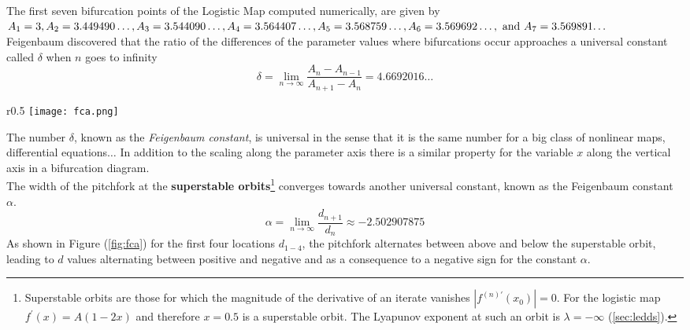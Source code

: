 The first seven bifurcation points of the Logistic Map computed numerically, are given by \\
$A_1=3, A_2=3.449490\ldots, A_3=3.544090\ldots, A_4=3.564407\ldots, A_5=3.568759\ldots,
A_6=3.569692\ldots,\text{ and}\\ \ A_7=3.569891{\ldots}$\\
Feigenbaum discovered that the ratio of the differences of the parameter values where bifurcations occur approaches a universal constant called $\delta$ when $n$ goes to infinity
\begin{equation}
	\delta=\lim_{n\rightarrow\infty}\frac{A_{n}-A_{n-1}}{A_{n+1}-A_n}=4.6692016\ldots
\end{equation}
\begin{wrapfigure}{r}{0.5\textwidth}
	\centering
	\texttt{[image: fca.png]}
	\caption{Universal scaling in the horizontal and vertical direction of a period doubling sequence.}
	\label{fig:fca}
\end{wrapfigure}
The number $\delta$, known as the \emph{Feigenbaum constant}, is universal in the sense that it is the same number for a big class of nonlinear maps, differential equations$\ldots$
In addition to the scaling along the parameter axis there is a similar property for the variable $x$ along the vertical axis in a bifurcation diagram.\\
The width of the pitchfork at the \textbf{superstable orbits}\footnote{Superstable orbits are those for which the magnitude of the derivative of an iterate vanishes $|f^{(n)\prime}(x_0)|=0$. For the logistic map $f^\prime(x)=A(1-2x)$ and therefore $x=0.5$ is a superstable orbit. The Lyapunov exponent at such an orbit is $\lambda=-\infty$ (\ref{sec:ledds}).} converges towards another universal constant, known as the Feigenbaum constant $\alpha$.
\begin{equation}
	\alpha=\lim_{n\rightarrow\infty}\frac{d_{n+1}}{d_n}\approx-2.502907875
\end{equation}
As shown in Figure (\ref{fig:fca}) for the first four locations $d_{1-4}$, the pitchfork alternates between above and below the superstable orbit, leading to $d$ values alternating between positive and negative and as a consequence to a negative sign for the constant $\alpha$.